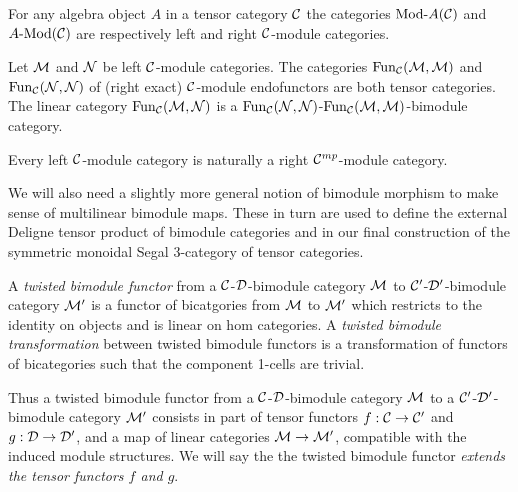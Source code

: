 \documentclass[a4paper]{amsart}
\begin{document}
\begin{example}
	For any algebra object $A$ in a tensor category $\mathcal C$ the categories $\Mod{}{A}(\cC)$ and $\Mod{A}{}(\cC)$ are respectively left and right $\mathcal C$-module categories. 
\end{example}

\begin{example}
	Let $\mathcal M$ and $\mathcal N$ be left $\mathcal C$-module categories. The categories $\operatorname{Fun}_{\mathcal C}(\mathcal M, \mathcal M)$ and $\operatorname{Fun}_{\mathcal C}(\mathcal N, \mathcal N)$ of (right exact) $\mathcal C$-module endofunctors are both tensor categories. The linear category $\operatorname{Fun}_{\mathcal C}(\mathcal M, \mathcal N)$ is a $\operatorname{Fun}_{\mathcal C}(\mathcal N, \mathcal N)$-$\operatorname{Fun}_{\mathcal C}(\mathcal M, \mathcal M)$-bimodule category.   
\end{example}

\begin{remark}
 	Every left $\mathcal C$-module category is naturally a right $\mathcal C^{mp}$-module category. 
\end{remark}

We will also need a slightly more general notion of bimodule morphism to make sense of multilinear bimodule maps. These in turn are used to define the external Deligne tensor product of bimodule categories and in our final construction of the symmetric monoidal Segal 3-category of tensor categories. 

\begin{definition}
	A {\em twisted bimodule functor} from a $\mathcal C$-$\mathcal D$-bimodule category $\mathcal M$  to $\mathcal C'$-$\mathcal D'$-bimodule category $\mathcal M'$ is a functor of bicatgories from $\mathcal M$ to $\mathcal M'$ which restricts to the identity on objects and is linear on hom categories. A {\em twisted bimodule transformation} between twisted bimodule functors is a transformation of functors of bicategories such that the component 1-cells are trivial.
\end{definition}

Thus a twisted bimodule functor from a $\mathcal C$-$\mathcal D$-bimodule category $\mathcal M$ to a $\mathcal C'$-$\mathcal D'$-bimodule category $\mathcal M'$ consists in part of tensor functors $f:\mathcal C \to \mathcal C'$ and $g:\mathcal D \to \mathcal D'$, and a map of linear categories $\mathcal M \to \mathcal M'$, compatible with the induced module structures. We will say the the twisted bimodule functor {\em extends the tensor functors $f$ and $g$}. 
\end{document}
